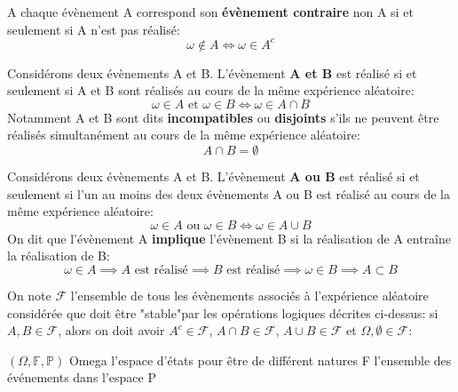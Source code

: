 \documentclass{article}
\begin{document}
\begin{definition}
    A chaque évènement A correspond son \textbf{évènement contraire} non A si et seulement si A n'est pas réalisé:
    \begin{equation}
        \boxed{
            \omega \notin A \iff \omega \in A^c
        }
    \end{equation}
\end{definition}

\begin{definition}
    Considérons deux évènements A et B. L'évènement \textbf{A et B} est réalisé si et seulement si A et B sont réalisés au cours de la même expérience aléatoire:
    \begin{equation}
        \boxed{
            \omega\in A\text{ et } \omega\in B \iff \omega\in A\cap B
        }
    \end{equation}
    Notamment A et B sont dits \textbf{incompatibles} ou \textbf{disjoints} s'ils ne peuvent être réalisés simultanément au cours de la même expérience aléatoire:
    \begin{equation}
        \boxed{
            A \cap B = \emptyset
        }
    \end{equation}
\end{definition}

\begin{definition}
    Considérons deux évènements A et B. L'évènement \textbf{A ou B} est réalisé si et seulement si l'un au moins des deux évènements A ou B est réalisé au cours de la même expérience aléatoire:
    \begin{equation}
        \boxed{
            \omega\in A\text{ ou } \omega\in B \iff \omega\in A\cup B
        }
    \end{equation}
    On dit que l'évènement A \textbf{implique} l'évènement B si la réalisation de A entraîne la réalisation de B: 
    \begin{equation}
        \boxed{
            \omega\in A \implies A \text{ est réalisé} \implies 
            B \text{ est réalisé} \implies \omega\in B \implies 
            A \subset B
        }
    \end{equation}
\end{definition}

\begin{definition}
    On note $\mathcal{F}$ l'ensemble de tous les évènements associés à l'expérience aléatoire considérée que doit être "stable"par les opérations logiques décrites ci-dessus: si $A, B \in \mathcal{F}$, alors on doit avoir $A^c \in \mathcal{F}$, $A \cap B \in \mathcal{F}$, $A \cup B \in \mathcal{F}$ et $\Omega, \emptyset \in \mathcal{F}$:
\end{definition}
$ (\Omega, \mathbb{F}, \mathbb{P})$
Omega l'espace d'états pour être de différent natures
F l'ensemble des événements dans l'espace
P
\end{document}
